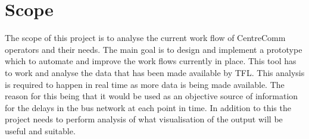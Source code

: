 
\section{Scope}
The scope of this project is to analyse the current work flow of CentreComm operators and their needs. The main goal is to design and implement a prototype which to automate and improve the work flows currently in place. This tool has to work and analyse the data that has been made available by TFL. This analysis is required to happen in real time as more data is being made available. The reason for this being that it would be used as an objective source of information for the delays in the bus network at each point in time. In addition to this the project needs to perform  analysis of what visualisation of the output will be useful and suitable.


